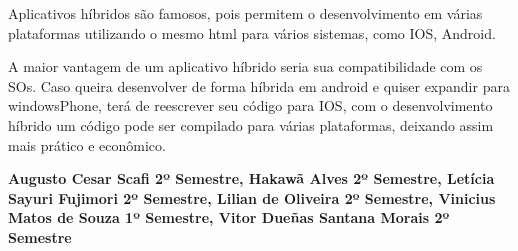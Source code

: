 Aplicativos híbridos são famosos, pois permitem o desenvolvimento em várias plataformas utilizando o mesmo html para vários sistemas, como IOS, Android.

A maior vantagem de um aplicativo híbrido seria sua compatibilidade com os SOs. Caso queira desenvolver de forma híbrida em android e quiser expandir para windowsPhone, terá de reescrever seu código para IOS, com o desenvolvimento híbrido um código pode ser compilado para várias plataformas, deixando assim mais prático e econômico.


\normalsize{\textbf{Augusto Cesar Scafi 2º Semestre, Hakawã Alves 2º Semestre, Letícia Sayuri Fujimori 2º Semestre, Lilian de Oliveira 2º Semestre, Vinicius Matos de Souza 1º Semestre, Vitor Dueñas Santana Morais 2º Semestre}}

\newpage 